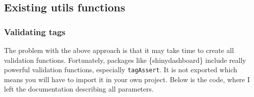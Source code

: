 \documentclass[
]{book}
\begin{document}
\hypertarget{existing-utils-functions}{%
\subsection{Existing utils functions}\label{existing-utils-functions}}

\hypertarget{validating-tags}{%
\subsubsection{Validating tags}\label{validating-tags}}

The problem with the above approach is that it may take time to create all validation functions. Fortunately, packages like \{shinydashboard\} include really powerful validation functions, especially \texttt{tagAssert}. It is not exported which means you will have to import it in your own project. Below is the code, where I left the documentation describing all parameters.
\end{document}
